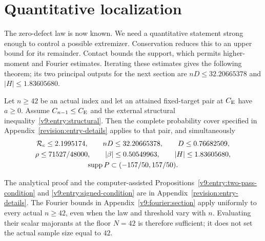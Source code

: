\section{Quantitative localization}\label{v9:entry:section}
The zero-defect law is now known. We need a quantitative statement
strong enough to control a possible extremizer. Conservation reduces
this to an upper bound for its remainder. Contact bounds the support,
which permits higher-moment and Fourier estimates. Iterating these
estimates gives the following theorem; its two principal outputs for
the next section are $nD\le32.20665378$ and $|H|\le1.83605680$.

\begin{theorem}\label{v9:entry:theorem}
Let $n\ge42$ be an actual index and let an attained fixed-target pair
at $C_{\mathrm E}$ have $a\ge0$. Assume $C_{n-1}\le C_{\mathrm E}$ and the external structural
inequality~\eqref{v9:entry:structural}. Then the complete probability cover
specified in Appendix~\ref{revision:entry-details} applies to that pair,
and simultaneously
\begin{gather*}
 \mathcal R_c\le2.1995174,\qquad nD\le32.20665378,
 \qquad D\le0.76682509,\\
 \rho\le71527/48000,\qquad |\beta|\le0.50549963,
 \qquad |H|\le1.83605680,\\
 \operatorname{supp} P\subset(-157/50,157/50).
\end{gather*}
\end{theorem}
The analytical proof and the computer-assisted
Propositions~\ref{v9:entry:two-pass-condition} and
\ref{v9:entry:signed-condition} are in
Appendix~\ref{revision:entry-details}. The Fourier bounds in
Appendix~\ref{v9:fourier:section} apply uniformly to every actual
$n\ge42$, even when the law and threshold vary with $n$.
Evaluating their scalar majorants at the floor $N=42$ is therefore
sufficient; it does not set the actual sample size equal to $42$.

